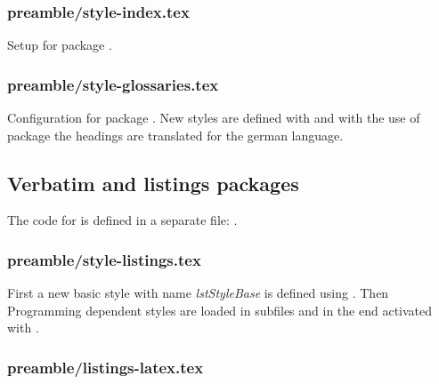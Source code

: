 \subsubsection{preamble/style-index.tex}

Setup for package .


\subsubsection{preamble/style-glossaries.tex}

Configuration for package . New styles are defined with  and with the use of package  the headings are translated for the german language.


\subsection{Verbatim and listings packages}
\label{sec:style:listings}

The code for  is defined in a separate file: .


\subsubsection{preamble/style-listings.tex}

First a new basic style with name \emph{lstStyleBase} is defined using . Then Programming dependent styles are loaded in subfiles and in the end activated with .


\subsubsection{preamble/listings-latex.tex}

